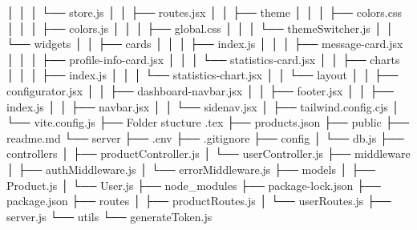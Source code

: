 │   │   │   └── store.js
│   │   ├── routes.jsx
│   │   ├── theme
│   │   │   ├── colors.css
│   │   │   ├── colors.js
│   │   │   ├── global.css
│   │   │   └── themeSwitcher.js
│   │   └── widgets
│   │       ├── cards
│   │       │   ├── index.js
│   │       │   ├── message-card.jsx
│   │       │   ├── profile-info-card.jsx
│   │       │   └── statistics-card.jsx
│   │       ├── charts
│   │       │   ├── index.js
│   │       │   └── statistics-chart.jsx
│   │       └── layout
│   │           ├── configurator.jsx
│   │           ├── dashboard-navbar.jsx
│   │           ├── footer.jsx
│   │           ├── index.js
│   │           ├── navbar.jsx
│   │           └── sidenav.jsx
│   ├── tailwind.config.cjs
│   └── vite.config.js
├── Folder stucture .tex
├── products.json
├── public
├── readme.md
└── server
    ├── .env
    ├── .gitignore
    ├── config
    │   └── db.js
    ├── controllers
    │   ├── productController.js
    │   └── userController.js
    ├── middleware
    │   ├── authMiddleware.js
    │   └── errorMiddleware.js
    ├── models
    │   ├── Product.js
    │   └── User.js
    ├── node_modules
    ├── package-lock.json
    ├── package.json
    ├── routes
    │   ├── productRoutes.js
    │   └── userRoutes.js
    ├── server.js
    └── utils
        └── generateToken.js
